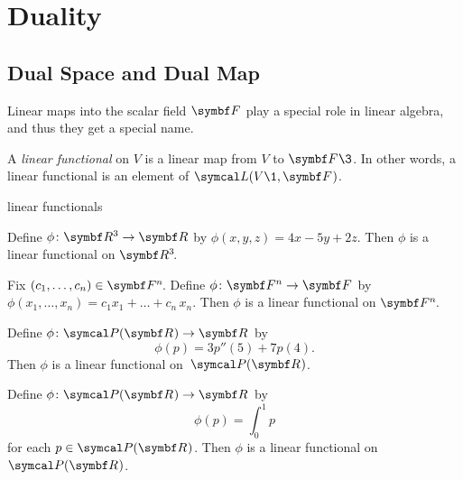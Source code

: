 \begin{exercises}

\end{exercises}

\section{Duality} \label{duals}

\subsection{Dual Space and Dual Map}

Linear maps into the scalar field $\F{}$ play a special role in linear algebra, and thus they get a special name.

{A \emph{linear functional} on $V$ is a linear map from $V$ to $\F{}\3$. In other words, a linear functional is an element of $\L(V\1, \F{})$.}

\begin{example}{linear functionals}
\begin{Itemize}
\item
Define $\phi \colon \R3 \to \R{}$ by $\phi(x, y, z) = 4x - 5y + 2z$. Then $\phi$ is a linear functional on $\RR3$.
\item
Fix $(c_1, \dots, c_n) \in \FF{n}$. Define $\phi \colon \F{n} \to \F{}$ by $\phi(x_1, \dots, x_n) = c_1 x_1 + \dots + c_n \, x_n$. Then $\phi$ is a linear functional on $\FF{n}$.
\item
Define $\phi \colon \P(\R{}) \to \R{}$ by \[\phi(p) = 3 p'' \! (5) + 7 p(4).\] Then $\phi$ is a linear functional on~$\P(\R{})$.
\item
Define $\fun \phi {\P(\R{})} {\R{}}$ by
\[
\phi(p) =\int_0^1 p
\]
for each $p \in \P(\R{})$. Then $\phi$ is a linear functional on~$\P(\R{})$.
\end{Itemize}
\exampleitemend
\end{example}

